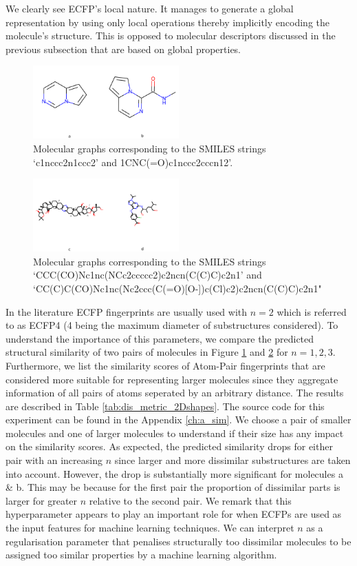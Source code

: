 We clearly see ECFP's local nature. It manages to generate a global representation by using only local operations thereby implicitly encoding the molecule's structure. This is opposed to molecular descriptors discussed in the previous subsection that are based on global properties.

\begin{figure}[h]
	\centering 
	\includegraphics[width=0.5\textwidth]{test1.png}
	\caption{Molecular graphs corresponding to the SMILES strings `c1nccc2n1ccc2' and 1CNC(=O)c1nccc2cccn12'.}
	\label{fig:molsa}
\end{figure}
\begin{figure}[h]
	\centering 
	\includegraphics[width=0.5\textwidth]{test2.png}
	\caption{Molecular graphs corresponding to the SMILES strings `CCC(CO)Nc1nc(NCc2ccccc2)c2ncn(C(C)C)c2n1' and `CC(C)C(CO)Nc1nc(Nc2ccc(C(=O)[O-])c(Cl)c2)c2ncn(C(C)C)c2n1" }
	\label{fig:molsb}
\end{figure}
In the literature ECFP fingerprints are usually used with $n=2$ which is referred to as ECFP4 (4 being the maximum diameter of substructures considered). To understand the importance of this parameters,  we compare the predicted structural similarity of two pairs of molecules in Figure \ref{fig:molsa} and \ref{fig:molsb} for $n=1,2,3$. Furthermore, we list the similarity scores of Atom-Pair fingerprints \citep{atompairs} that are considered more suitable for representing larger molecules since they aggregate information of all pairs of atoms seperated by an arbitrary distance. The results are described in Table \ref{tab:dis_metric_2Dshapes}. The source code for this experiment can be found in the Appendix \ref{ch:a_sim}. We choose a pair of smaller molecules and one of larger molecules to understand if their size has any impact on the similarity scores. As expected, the predicted similarity drops for either pair with an increasing $n$ since larger and more dissimilar substructures are taken into account. However, the drop is substantially more significant for molecules a \& b.  This may be because for the first pair the proportion of dissimilar parts is larger for greater $n$ relative to the second pair. We remark that this hyperparameter appears to play an important role for when ECFPs are used as the input features for machine learning techniques. We can interpret $n$ as a regularisation parameter that penalises structurally too dissimilar molecules to be assigned too similar properties by a machine learning algorithm.
